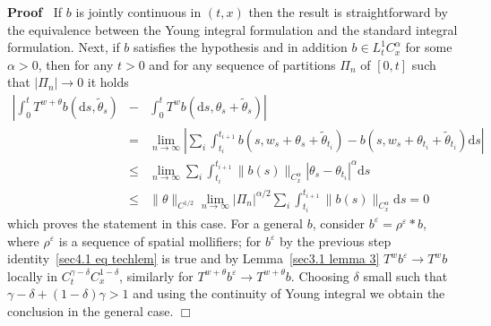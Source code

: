 \documentclass[10pt]{article}
\newcommand{\mathd}{\mathrm{d}}
\newenvironment{proof}{\noindent\textbf{Proof\ }}{\hspace*{\fill}$\Box$\medskip}
\begin{document}
\begin{proof}
  If $b$ is jointly continuous in $(t, x)$ then the result is straightforward
  by the equivalence between the Young integral formulation and the standard
  integral formulation. Next, if $b$ satisfies the hypothesis and in addition
  $b \in L^1_t C^{\alpha}_x$ for some $\alpha > 0$, then for any $t > 0$ and
  for any sequence of partitions $\Pi_n$ of $[0, t]$ such that $| \Pi_n |
  \rightarrow 0$ it holds
  \begin{eqnarray*}
    \left| \int_0^t T^{w + \theta} b (\mathd s, \tilde{\theta}_s) \right. & -
    & \left. \int_0^t T^w b (\mathd s, \theta_s + \tilde{\theta}_s) \right|\\
    & = & \lim_{n \rightarrow \infty} \left| \sum_i \int_{t_i}^{t_{i + 1}} b
    (s, w_s + \theta_s + \tilde{\theta}_{t_i}) - b (s, w_s + \theta_{t_i} +
    \tilde{\theta}_{t_i}) \mathd s \right|\\
    & \leqslant & \lim_{n \rightarrow \infty} \sum_i \int_{t_i}^{t_{i + 1}}
    \| b (s) \|_{C^{\alpha}_x}  | \theta_s - \theta_{t_i} |^{\alpha} \mathd
    s\\
    & \leqslant & \| \theta \|_{C^{1 / 2}} \lim_{n \rightarrow \infty} |
    \Pi_n |^{\alpha / 2} \sum_i \int_{t_i}^{t_{i + 1}} \| b (s)
    \|_{C^{\alpha}_x} \mathd s = 0
  \end{eqnarray*}
  which proves the statement in this case. For a general $b$, consider
  $b^{\varepsilon} = \rho^{\varepsilon} \ast b$, where $\rho^{\varepsilon}$ is
  a sequence of spatial mollifiers; for $b^{\varepsilon}$ by the previous step
  identity~{\eqref{sec4.1 eq techlem}} is true and by Lemma~\ref{sec3.1 lemma
  3} $T^w b^{\varepsilon} \rightarrow T^w b$ locally in $C^{\gamma - \delta}_t
  C^{1 - \delta}_x$, similarly for $T^{w + \theta} b^{\varepsilon} \rightarrow
  T^{w + \theta} b$. Choosing $\delta$ small such that $\gamma - \delta + (1 -
  \delta) \gamma > 1$ and using the continuity of Young integral we obtain the
  conclusion in the general case.
\end{proof}
\end{document}
